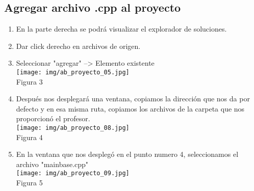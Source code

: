 \documentclass[12pt, a4paper]{article}
\begin{document}
\subsection{Agregar archivo .cpp al proyecto}
\begin{enumerate}
	\raggedright 
	\item En la parte derecha se podrá visualizar el explorador de soluciones.
	\item Dar click derecho en archivos de origen.
	\item Seleccionar "agregar" --> Elemento existente \\[.25cm]
	\centering 
	\texttt{[image: img/ab\_proyecto\_05.jpg]}\\[.25cm] %
	Figura 3 \\[.35cm]
	\raggedright 
	\item Después nos desplegará una ventana, copiamos la dirección que nos da por defecto y en esa misma ruta, copiamos los archivos de la carpeta que nos proporcionó el profesor.\\[.25cm] 
	\centering 
	\texttt{[image: img/ab\_proyecto\_08.jpg]}\\[.25cm] %
	Figura 4 \\[.5cm]
	\raggedright 	
	\item En la ventana que nos desplegó en el punto numero 4, seleccionamos el archivo "mainbase.cpp"\\[.25cm] 
	\centering 
	\texttt{[image: img/ab\_proyecto\_09.jpg]}\\[.25cm] %
	Figura 5 \\[.5cm]
	\end{enumerate}
\end{document}
